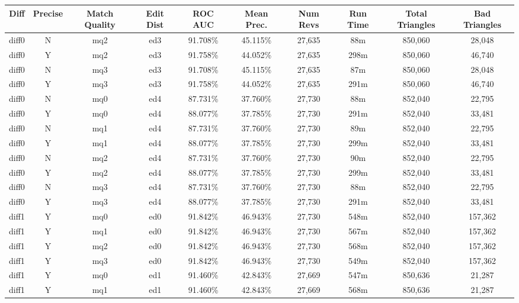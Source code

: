 \begin{sidewaystable}[!tp]
  \begin{center}
    \begin{tabular}{|c|c|c|c||c|c||c|c|c|c|}
\hline
Diff & Precise & Match Quality & Edit Dist
        & ROC AUC & Mean Prec.
        & Num Revs & Run Time
        & Total Triangles & Bad Triangles \\
\hline
\hline
diff0 & N & mq2 & ed3 & 91.708\% & 45.115\% & 27,635 & 88m & 850,060 & 28,048 \\
diff0 & Y & mq2 & ed3 & 91.758\% & 44.052\% & 27,635 & 298m & 850,060 & 46,740 \\
diff0 & N & mq3 & ed3 & 91.708\% & 45.115\% & 27,635 & 87m & 850,060 & 28,048 \\
diff0 & Y & mq3 & ed3 & 91.758\% & 44.052\% & 27,635 & 291m & 850,060 & 46,740 \\
diff0 & N & mq0 & ed4 & 87.731\% & 37.760\% & 27,730 & 88m & 852,040 & 22,795 \\
diff0 & Y & mq0 & ed4 & 88.077\% & 37.785\% & 27,730 & 291m & 852,040 & 33,481 \\
diff0 & N & mq1 & ed4 & 87.731\% & 37.760\% & 27,730 & 89m & 852,040 & 22,795 \\
diff0 & Y & mq1 & ed4 & 88.077\% & 37.785\% & 27,730 & 299m & 852,040 & 33,481 \\
diff0 & N & mq2 & ed4 & 87.731\% & 37.760\% & 27,730 & 90m & 852,040 & 22,795 \\
diff0 & Y & mq2 & ed4 & 88.077\% & 37.785\% & 27,730 & 299m & 852,040 & 33,481 \\
diff0 & N & mq3 & ed4 & 87.731\% & 37.760\% & 27,730 & 88m & 852,040 & 22,795 \\
diff0 & Y & mq3 & ed4 & 88.077\% & 37.785\% & 27,730 & 291m & 852,040 & 33,481 \\
diff1 & Y & mq0 & ed0 & 91.842\% & 46.943\% & 27,730 & 548m & 852,040 & 157,362 \\
diff1 & Y & mq1 & ed0 & 91.842\% & 46.943\% & 27,730 & 567m & 852,040 & 157,362 \\
diff1 & Y & mq2 & ed0 & 91.842\% & 46.943\% & 27,730 & 568m & 852,040 & 157,362 \\
diff1 & Y & mq3 & ed0 & 91.842\% & 46.943\% & 27,730 & 549m & 852,040 & 157,362 \\
diff1 & Y & mq0 & ed1 & 91.460\% & 42.843\% & 27,669 & 547m & 850,636 & 21,287 \\
diff1 & Y & mq1 & ed1 & 91.460\% & 42.843\% & 27,669 & 568m & 850,636 & 21,287 \\

\end{tabular}
\end{center}
\end{sidewaystable}
